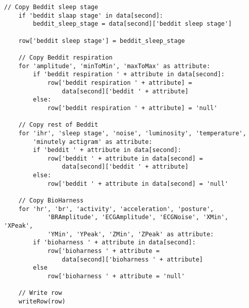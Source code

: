 \begin{lstlisting}[caption=Pseudocode]
	// Copy Beddit sleep stage
	if 'beddit slaap stage' in data[second]:
		beddit_sleep_stage = data[second]['beddit sleep stage']

	row['beddit sleep stage'] = beddit_sleep_stage

	// Copy Beddit respiration
	for 'amplitude', 'minToMin', 'maxToMax' as attribute:
		if 'beddit respiration ' + attribute in data[second]:
			row['beddit respiration ' + attribute] = 
				data[second]['beddit ' + attribute]
		else:
			row['beddit respiration ' + attribute] = 'null'

	// Copy rest of Beddit
	for 'ihr', 'sleep stage', 'noise', 'luminosity', 'temperature',
		'minutely actigram' as attribute:
		if 'beddit ' + attribute in data[second]:
			row['beddit ' + attribute in data[second] =
				data[second]['beddit ' + attribute]
		else:
			row['beddit ' + attribute in data[second] = 'null'

	// Copy BioHarness
	for 'hr', 'br', 'activity', 'acceleration', 'posture',
			'BRAmplitude', 'ECGAmplitude', 'ECGNoise', 'XMin', 'XPeak',
			'YMin', 'YPeak', 'ZMin', 'ZPeak' as attribute:
		if 'bioharness ' + attribute in data[second]:
			row['bioharness ' + attribute =
				data[second]['bioharness ' + attribute]
		else
			row['bioharness ' + attribute = 'null'

	// Write row
	writeRow(row)

	

\end{lstlisting}
